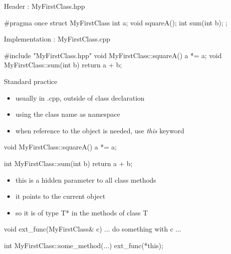 \begin{frame}[fragile]
  \begin{block}{Header : MyFirstClass.hpp}
    \begin{cppcode*}{}
      #pragma once
      struct MyFirstClass {
        int a;
        void squareA();
        int sum(int b);
      };
    \end{cppcode*}
  \end{block}
  \begin{block}{Implementation : MyFirstClass.cpp}
    \begin{cppcode*}{}
      #include "MyFirstClass.hpp"
      void MyFirstClass::squareA() {
        a *= a;
      }
      void MyFirstClass::sum(int b) {
        return a + b;
      }
    \end{cppcode*}
  \end{block}
\end{frame}

\begin{frame}[fragile]
  \begin{block}{Standard practice}
    \begin{itemize}
    \item usually in .cpp, outside of class declaration
    \item using the class name as namespace
    \item when reference to the object is needed, use {\it this} keyword
    \end{itemize}
  \end{block}
  \begin{cppcode}
    void MyFirstClass::squareA() {
      a *= a;
    }

    int MyFirstClass::sum(int b) {
      return a + b;
    }
  \end{cppcode}
\end{frame}

\begin{frame}[fragile]
  \begin{block}{}
    \begin{itemize}
    \item {\ttfamily this} is a hidden parameter to all class methods
    \item it points to the current object
    \item so it is of type {\ttfamily T*} in the methods of class {\ttfamily T}
    \end{itemize}
  \end{block}
  \begin{cppcode}
    void ext_func(MyFirstClass& c) {
      ... do something with c ...
    }

    int MyFirstClass::some_method(...) {
      ext_func(*this);
    }
  \end{cppcode}
\end{frame}


